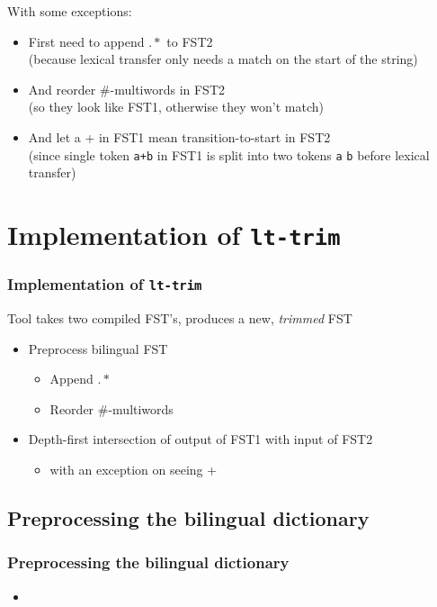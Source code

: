 \documentclass[notes=hide]{beamer}
\newcommand{\ana}[1]{\texttt{#1}}
\newcommand{\tool}[1]{\texttt{#1}}
\begin{document}
\begin{frame}
  With some exceptions:
  \begin{itemize}
    \item First need to append $.*$ to FST2 \\(because lexical transfer only needs
      a match on the start of the string)
    \item And reorder \#-multiwords in FST2 \\(so they look
      like FST1, otherwise they won't match)
    \item And let a + in FST1 mean transition-to-start in FST2 \\(since
      single token \ana{a+b} in FST1 is split into two tokens \ana{a} \ana{b} before
      lexical transfer)
  \end{itemize}
\end{frame}

\section{Implementation of \tool{lt-trim}}
\begin{frame}
  \frametitle{Implementation of \tool{lt-trim}}
  Tool takes two compiled FST's, produces a new, \emph{trimmed} FST
  \begin{itemize}
  \item Preprocess bilingual FST
    \begin{itemize}
    \item Append $.*$
    \item Reorder \#-multiwords
    \end{itemize}
  \item Depth-first intersection of output of FST1 with input of FST2
    \begin{itemize}
    \item with an exception on seeing +
    \end{itemize}
  \end{itemize}
\end{frame}

\subsection{Preprocessing the bilingual dictionary}
\begin{frame}
  \frametitle{Preprocessing the bilingual dictionary}
  \begin{itemize}
  \item
  \end{itemize}
\end{frame}
\end{document}
